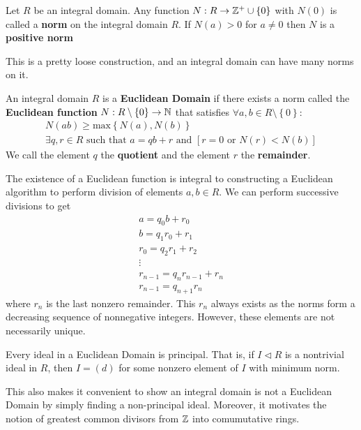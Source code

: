 \documentclass{memoir}
\begin{document}


\begin{defn}
	Let \(R\) be an integral domain. Any function \(N:R\to \mathbb{Z}^{+}\cup \left\{ 0 \right\} \) with \(N(0)\) is called a \textbf{norm} on the integral domain \(R\). If \(N(a) > 0\) for \(a\neq 0\) then \(N\) is a \textbf{positive norm}
\end{defn}
This is a pretty loose construction, and an integral domain can have many norms on it.\\

\begin{defn}
	An integral domain \(R\) is a \textbf{Euclidean Domain} if there exists a norm called the \textbf{Euclidean function} \(N:R\setminus\left\{ 0 \right\} \to \mathbb{N}\) that satisfies \(\forall a,b \in R\setminus \left\{ 0 \right\} \):
	\begin{align*}
		N(ab) \geq \textrm{max}\left\{ N(a),N(b) \right\}\\
		\exists q,r \in R \text{ such that }a = qb + r \text{ and }\left[ r = 0 \text{ or }N(r)<N(b) \right] 
	\end{align*}
	We call the element \(q\) the \textbf{quotient} and the element \(r\) the  \textbf{remainder}.
\end{defn}
The existence of a Euclidean function is integral to constructing a Euclidean algorithm to perform division of elements \(a,b \in R\). We can perform successive divisions to get
\begin{align*}
	a = q_0b + r_0\\
	b = q_1r_0 + r_1\\
	r_0 = q_2r_1 + r_2\\
	\vdots\\
	r_{n-1}= q_nr_{n-1}+r_n\\
	r_{n-1} = q_{n+1}r_n
\end{align*}
where \(r_n\) is the last nonzero remainder. This \(r_n\) always exists as the norms form a decreasing sequence of nonnegative integers. However, these elements are not necessarily unique.

\begin{prop}
	Every ideal in a Euclidean Domain is principal. That is, if \(I\triangleleft R\) is a nontrivial ideal in \(R\), then \(I = (d)\) for some nonzero element of \(I\) with minimum norm.
\end{prop}
This also makes it convenient to show an integral domain is not a Euclidean Domain by simply finding a non-principal ideal. Moreover, it motivates the notion of greatest common divisors from \(\mathbb{Z}\) into comumutative rings.
\end{document}
